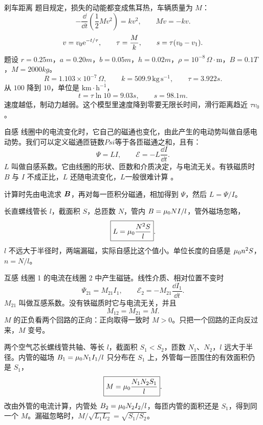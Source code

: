 \begin{frame}{刹车距离}
题目规定，损失的动能都变成焦耳热，车辆质量为 $M$：
\[
 -\frac{\dd}{\dd t}\!\left(\frac12 Mv^2\right)=kv^2,
 \qquad M\dot v=-kv.
\]
\[
 v=v_0\mathrm e^{-t/\tau},\qquad \tau=\frac{M}{k},
 \qquad s=\tau(v_0-v_1).
\]
题设 $r=0.25\unit{m}$，$a=0.20\unit{m}$，$b=0.05\unit{m}$，$h=0.02\unit{m}$，$\rho=10^{-8}\,\Omega\cdot\mathrm{m}$，$B=0.1\unit{T}$，$M=2000\unit{kg}$。
\[
 R=1.103\times10^{-7}\,\Omega,\qquad
 k=509.9\,\mathrm{kg\,s^{-1}},\qquad
 \tau=3.922\unit{s}.
\]
从 $100$ 降到 $10$，单位是 $\mathrm{km\cdot h^{-1}}$，
\[
 t=\tau\ln 10=9.03\unit{s},\qquad
 s=\boxed{98.1\unit{m}}.
\]
速度越低，制动力越弱。这个模型里速度降到零要无限长时间，滑行距离趋近 $\tau v_0$。
\end{frame}

\begin{frame}{自感}
线圈中的电流变化时，它自己的磁通也变化，由此产生的电动势叫做自感电动势。我们可以定义磁通匝链数$Psi$等于各匝磁通之和，且有：
\[
 \Psi=LI,\qquad
 \mathcal{E}=-L\frac{\dd I}{\dd t}.
\]
$L$ 叫做自感系数。它由线圈的形状、匝数和介质决定，与电流无关。有铁磁质时 $B$ 与 $I$ 不成正比，$L$ 还随电流变化，$L$一般很难计算 。

计算时先由电流求 $\bm{B}$，再对每一匝积分磁通，相加得到 $\Psi$，然后 $L=\Psi/I$。

长直螺线管长 $l$，截面积 $S$，总匝数 $N$，管内 $B=\mu_0 NI/l$，管外磁场忽略，
\[
 \boxed{L=\mu_0\frac{N^2S}{l}}.
\]
$l$ 不远大于半径时，两端漏磁，实际自感比这个值小。单位长度的自感是 $\mu_0 n^2S$，$n=N/l$。
\end{frame}

\begin{frame}{互感}
线圈 1 的电流在线圈 2 中产生磁链。线性介质、相对位置不变时
\[
 \Psi_{21}=M_{21}I_1,\qquad
 \mathcal{E}_2=-M_{21}\frac{\dd I_1}{\dd t}.
\]
$M_{21}$ 叫做互感系数。没有铁磁质时它与电流无关，并且
\[
 M_{12}=M_{21}=M.
\]
$M$ 的正负看两个回路的正向：正向取得一致时 $M>0$。只把一个回路的正向反过来，$M$ 变号。

两个空气芯长螺线管共轴、等长 $l$，截面积 $S_1<S_2$，匝数 $N_1$、$N_2$，$l$ 远大于半径。内管的磁场 $B_1=\mu_0 N_1I_1/l$ 只分布在 $S_1$ 上，外管每一匝围住的有效面积仍是 $S_1$，
\[
 \boxed{M=\mu_0\frac{N_1N_2S_1}{l}}.
\]
改由外管的电流计算，内管处 $B_2=\mu_0 N_2I_2/l$，每匝内管的面积还是 $S_1$，得到同一个 $M$。漏磁忽略时，$M/\sqrt{L_1L_2}=\sqrt{S_1/S_2}$。
\end{frame}

